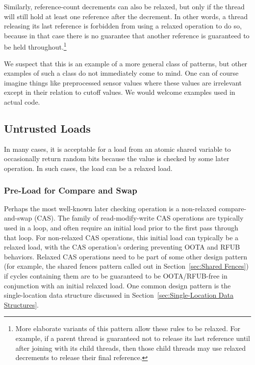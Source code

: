 \documentclass[10]{article}
\begin{document}
Similarly, reference-count decrements can also be relaxed, but only if
the thread will still hold at least one reference after the decrement.
In other words, a thread releasing its last reference is forbidden
from using a relaxed operation to do so, because in that case there
is no guarantee that another reference is guaranteed to be held
throughout.\footnote{
	More elaborate variants of this pattern allow these rules to
	be relaxed.
	For example, if a parent thread is guaranteed not to release
	its last reference until after joining with its child threads,
	then those child threads may use relaxed decrements to release
	their final reference.}

We suspect that this is an example of a more general class of patterns,
but other examples of such a class do not immediately come to mind.
One can of course imagine things like preprocessed sensor values where
these values are irrelevant except in their relation to cutoff values.
We would welcome examples used in actual code.

\subsection{Untrusted Loads}
\label{sec:Untrusted Loads}

In many cases, it is acceptable for a load from an atomic shared variable
to occasionally return random bits because the value is checked by
some later operation.
In such cases, the load can be a relaxed load.

\subsubsection{Pre-Load for Compare and Swap}
\label{sec:Pre-Load for Compare and Swap}

Perhaps the most well-known later checking operation is a non-relaxed
compare-and-swap (CAS).
The  family of read-modify-write
CAS operations are typically used in a loop, and often require an initial
load prior to the first pass through that loop.
For non-relaxed CAS operations, this initial load can typically be a
relaxed load, with the CAS operation's ordering preventing OOTA and RFUB
behaviors.
Relaxed CAS operations need to be part of some other design pattern
(for example, the shared fences pattern called out in
Section~\ref{sec:Shared Fences})
if cycles containing them are to be guaranteed to be OOTA/RFUB-free in
conjunction with an initial relaxed load.
One common design pattern is the single-location data structure discussed in
Section~\ref{sec:Single-Location Data Structures}.
\end{document}
